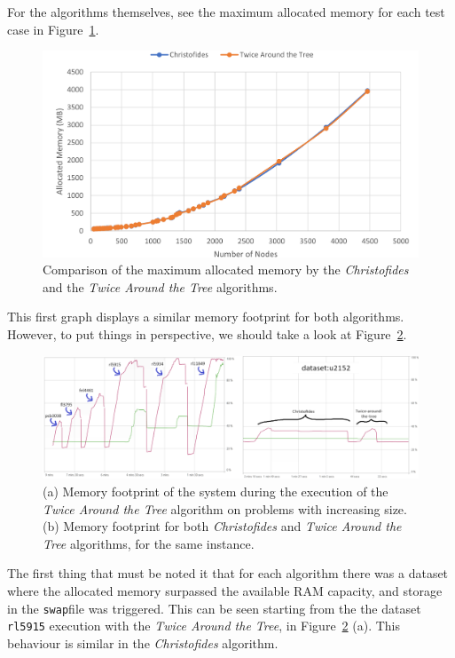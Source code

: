 \documentclass[12pt]{article}
\begin{document}
For the algorithms themselves, see the maximum allocated memory for each test case in Figure~\ref{fig:mem_use}.

\begin{figure}[ht]
\centering
\includegraphics[height=.325\textheight]{images/memory_use_comparison.png}
\caption{Comparison of the maximum allocated memory by the \textit{Christofides} and the \textit{Twice Around the Tree} algorithms.}
\label{fig:mem_use}
\end{figure}

This first graph displays a similar memory footprint for both algorithms. However, to put things in perspective, 
we should take a look at Figure~\ref{fig:memory_behaviour}.

\begin{figure}[ht]
\centering
\includegraphics[width=\textwidth]{images/memory_profile_comparison.png}
\caption{(a) Memory footprint of the system during the execution of the \textit{Twice Around the Tree} algorithm on problems with increasing size. (b) Memory footprint for both \textit{Christofides} and \textit{Twice Around the Tree} algorithms, for the same instance.}
\label{fig:memory_behaviour}
\end{figure}

The first thing that must be noted it that for each algorithm there was a dataset where the allocated memory surpassed 
the available RAM capacity, and storage in the \texttt{swap}\footnotemark file was triggered. This can be seen starting from the the dataset \texttt{rl5915} execution with the \textit{Twice Around the Tree}, 
in Figure~\ref{fig:memory_behaviour} (a). This behaviour is similar in the \textit{Christofides} algorithm.
\end{document}
